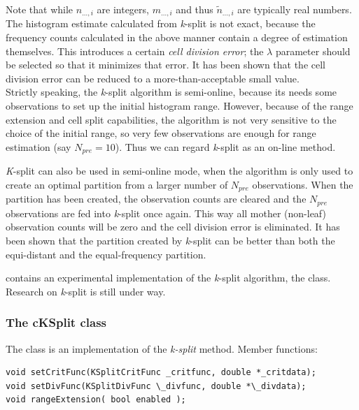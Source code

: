 
Note that while $n_{...,i}$ are integers, $m_{...,i}$ and thus
$\tilde{n}_{...,i}$ are typically real numbers. The histogram estimate
calculated from \textit{k}-split is not exact, because the frequency
counts calculated in the above manner contain a degree of estimation
themselves. This introduces a certain \textit{cell division error};
the $\lambda$ parameter should be selected so that it minimizes that
error. It has been shown that the cell division error can
be reduced to a more-than-acceptable small value.\\
Strictly speaking, the \textit{k}-split algorithm is semi-online,
because its needs some observations to set up the initial histogram
range.  However, because of the range extension and cell split
capabilities, the algorithm is not very sensitive to the choice of the
initial range, so very few observations are enough for range
estimation (say $N_{pre}=10$). Thus we can regard \textit{k}-split as
an on-line method.

\textit{K}-split can also be used in semi-online mode, when the
algorithm is only used to create an optimal partition from a larger
number of $N_{pre}$ observations. When the partition has been created,
the observation counts are cleared and the $N_{pre}$ observations are
fed into \textit{k}-split once again. This way all mother (non-leaf)
observation counts will be zero and the cell division error is
eliminated. It has been shown that the partition created by
\textit{k}-split can be better than both the equi-distant and the
equal-frequency partition.


{\opp} contains an experimental implementation of the \textit{k}-split
algorithm, the  class. Research on \textit{k}-split is
still under way.


\subsubsection{The cKSplit class}

The  class is an implementation of the \textit{k-split} method.
Member functions:

%
%

\begin{verbatim}
void setCritFunc(KSplitCritFunc _critfunc, double *_critdata);
void setDivFunc(KSplitDivFunc \_divfunc, double *\_divdata);
void rangeExtension( bool enabled );
\end{verbatim}



